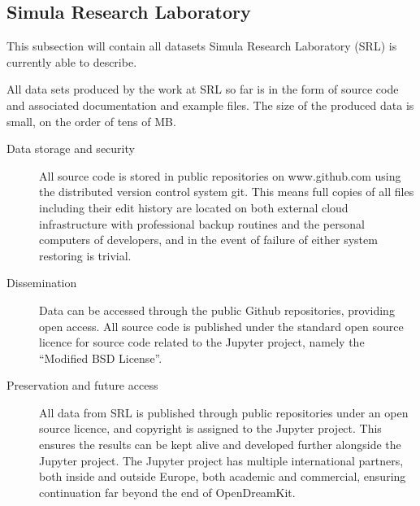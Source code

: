 \documentclass[12pt]{article}
\begin{document}
\subsection{Simula Research Laboratory}

This subsection will contain all datasets Simula Research Laboratory
(SRL) is currently able to describe.

All data sets produced by the work at SRL so far is in the form of
source code and associated documentation and example files.
The size of the produced data is small, on the order of tens of MB.

\begin{description}
\item[Data storage and security] All source code is stored in public
  repositories on www.github.com using the distributed version control
  system git. This means full copies of all files including their edit
  history are located on both external cloud infrastructure with
  professional backup routines and the personal computers of
  developers, and in the event of failure of either system restoring
  is trivial.

\item[Dissemination] Data can be accessed through the public Github
  repositories, providing open access. All source code is published
  under the standard open source licence for source code related to
  the Jupyter project, namely the ``Modified BSD License''.

\item[Preservation and future access] All data from SRL is published
  through public repositories under an open source licence, and
  copyright is assigned to the Jupyter project. This ensures the
  results can be kept alive and developed further alongside the
  Jupyter project. The Jupyter project has multiple international
  partners, both inside and outside Europe, both academic and
  commercial, ensuring continuation far beyond the end of
  OpenDreamKit.

\end{description}
\end{document}
